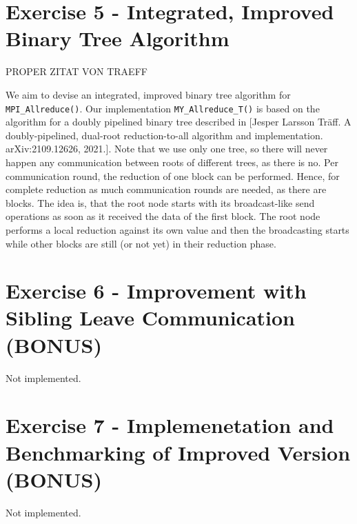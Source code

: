\section{Exercise 5 - Integrated, Improved Binary Tree Algorithm}

PROPER ZITAT VON TRAEFF 

We aim to devise an integrated, improved binary tree algorithm for \texttt{MPI\_Allreduce()}. Our 
implementation \texttt{MY\_Allreduce\_T()} is based on the algorithm for a doubly pipelined binary 
tree described in [Jesper Larsson Träff. A doubly-pipelined, dual-root reduction-to-all algorithm and 
implementation. arXiv:2109.12626, 2021.]. Note that we use only one tree, so there will never happen any 
communication between roots of different trees, as there is no. Per communication round, the reduction of 
one block can be performed. Hence, for complete reduction as much communication rounds are needed, 
as there are blocks. The idea is, that the root node starts with its broadcast-like send operations 
as soon as it received the data of the first block. The root node performs a local reduction against 
its own value and then the broadcasting starts while other blocks are still (or not yet) 
in their reduction phase. \\


\pagebreak
\section{Exercise 6 - Improvement with Sibling Leave Communication (BONUS)}
Not implemented.

\section{Exercise 7 - Implemenetation and Benchmarking of Improved Version (BONUS)}
Not implemented.
\pagebreak